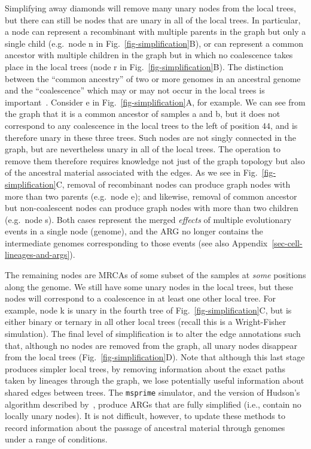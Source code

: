\documentclass[9pt,twocolumn,twoside]{gsajnl}
\newcommand{\noderef}[1]{\textsf{#1}}
\begin{document}
Simplifying away diamonds will remove many unary nodes from the
local trees, but there can still be nodes that are unary in all
of the local trees. In particular, a node can represent a recombinant
with multiple parents in the graph but only a single child (e.g.\ node \noderef{n}
in Fig.~\ref{fig-simplification}B), or can represent a common ancestor with
multiple children in the graph but in which no coalescence takes place
in the local trees
(node \noderef{r} in Fig.~\ref{fig-simplification}B).
The distinction between the ``common ancestry'' of two or more genomes
in an ancestral genome and the ``coalescence'' which may or may
not occur in the local trees is
important~\citep{hudson1983testing,kelleher2016efficient}.
Consider \noderef{e} in Fig.~\ref{fig-simplification}A,
for example. We can see from the graph that it is a common
ancestor of samples \noderef{a} and \noderef{b}, but
it does not correspond to any coalescence in the
local trees to the left of position $44$, and is therefore
unary in these three trees.
Such nodes are not singly connected in the graph, but are nevertheless unary in
all of the local trees.
The operation to remove them
therefore requires knowledge not just of the graph topology but also of the
ancestral material associated with the edges.
As we see in Fig.~\ref{fig-simplification}C,
removal of recombinant nodes can produce graph nodes with
more than two parents (e.g.~node \noderef{e}); and likewise, removal of
common ancestor but non-coalescent nodes can produce graph nodes with
more than two children (e.g.~node \noderef{s}). Both cases represent the
merged
\emph{effects} of multiple evolutionary events in a single node (genome), and the
ARG no longer contains the intermediate genomes corresponding to
those events (see also Appendix~\ref{sec-cell-lineages-and-args}).

The remaining nodes are MRCAs of some subset of the samples
at \emph{some} positions along the genome. We still have
some unary nodes in the local trees, but these nodes will
correspond to a coalescence in at least one other
local tree. For example, node  \noderef{k} is unary in the fourth tree
of Fig.~\ref{fig-simplification}C, but is either binary
or ternary in all other local trees (recall this is a Wright-Fisher
simulation). The final level of simplification is to alter the edge annotations
such that, although no nodes are removed from the graph, all
unary nodes disappear from the local trees (Fig.~\ref{fig-simplification}D).
Note that although this last stage produces simpler local trees, by
removing information about the exact paths taken by lineages through
the graph, we lose potentially useful information about shared edges
between trees.
The \texttt{msprime} simulator, and the version of Hudson's algorithm described
by~\citet{kelleher2016efficient}, produce ARGs
that are fully simplified (i.e., contain no locally unary nodes).
It is not difficult, however, to update
these methods to record information about the passage of ancestral
material through genomes under a range of conditions.
\end{document}
